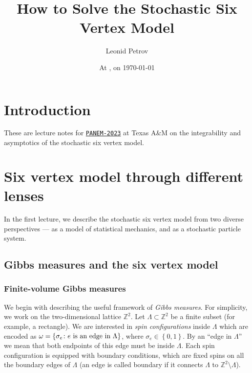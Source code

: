 \documentclass[letterpaper,11pt,oneside,reqno]{article}
\numberwithin{equation}{section}
\theoremstyle{definition}
\begin{document}
\title{How to Solve the Stochastic Six Vertex Model}


\author{Leonid Petrov}

\date{At \currenttime{}, on \today}

\setcounter{tocdepth}{4}

\maketitle


\section*{Introduction}

These are lecture notes for \href{https://www.math.tamu.edu/conferences/functional_analysis/PANEM.html}{\texttt{PANEM-2023}} at Texas A{}\&M on the integrability and asymptotics of the stochastic six vertex model.



\newpage
\section{Six vertex model through different lenses}
\label{sec:6v_model_lecture}

In the first lecture, we describe the stochastic six vertex model
from two diverse perspectives --- as a model of statistical mechanics,
and as a stochastic particle system.

\subsection{Gibbs measures and the six vertex model}
\label{sub:gibbs_6v}

\subsubsection{Finite-volume Gibbs measures}

We begin with describing the useful framework of \emph{Gibbs measures}.
For simplicity, we work on the two-dimensional lattice $\mathbb{Z}^2$.
Let $\Lambda\subset\mathbb{Z}^{2}$ be a finite subset (for example, a rectangle).
We are interested in \emph{spin configurations} inside $\Lambda$
which are encoded as $\omega=\{\sigma_e\colon e \textnormal{ is an edge in $\Lambda$}\}$,
where $\sigma_e\in\left\{ 0,1 \right\}$.
By an ``edge in $\Lambda$'' we mean that both endpoints of this edge must be inside $\Lambda$.
Each spin configuration is equipped with boundary conditions,
which are fixed spins on all the boundary edges of $\Lambda$
(an edge is called boundary if it connects $\Lambda$ to $\mathbb{Z}^{2}\setminus \Lambda$).
\end{document}
